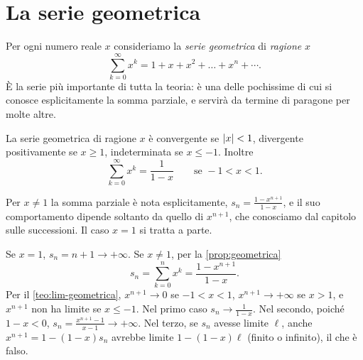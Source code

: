 \section{La serie geometrica}
\label{sec:serie-geometrica}

Per ogni numero reale $x$ consideriamo la \emph{serie geometrica} di \emph{ragione} $x$
\begin{equation}\label{eq:serie-geometrica-def}
  \sum_{k=0}^{\infty}x^{k}=1+x+x^{2}+\dots+x^{n}+\cdots .
\end{equation}
È la serie più importante di tutta la teoria: è una delle pochissime di cui si conosce
esplicitamente la somma parziale, e servirà da termine di paragone per molte altre.

\begin{teorema}\label{teo:serie-geometrica}
La serie geometrica di ragione $x$ è convergente se $\lvert x\rvert<1$, divergente
positivamente se $x\ge1$, indeterminata se $x\le-1$. Inoltre
\begin{equation}\label{eq:serie-geometrica}
  \sum_{k=0}^{\infty}x^{k}=\frac1{1-x} \qquad\text{se } -1<x<1 .
\end{equation}
\end{teorema}

\begin{schema}
\end{schema}

\begin{strategia}
Per $x\neq1$ la somma parziale è nota esplicitamente, $s_{n}=\frac{1-x^{n+1}}{1-x}$, e il suo
comportamento dipende soltanto da quello di $x^{n+1}$, che conosciamo dal capitolo sulle
successioni. Il caso $x=1$ si tratta a parte.
\end{strategia}

\begin{dimostrazione}
Se $x=1$, $s_{n}=n+1\to+\infty$. Se $x\neq1$, per la \cref{prop:geometrica}
\begin{equation}\label{eq:somma-parziale-geometrica}
  s_{n}=\sum_{k=0}^{n}x^{k}=\frac{1-x^{n+1}}{1-x} .
\end{equation}
Per il \cref{teo:lim-geometrica}, $x^{n+1}\to0$ se $-1<x<1$, $x^{n+1}\to+\infty$ se $x>1$, e
$x^{n+1}$ non ha limite se $x\le-1$. Nel primo caso $s_{n}\to\frac1{1-x}$. Nel secondo, poiché
$1-x<0$, $s_{n}=\frac{x^{n+1}-1}{x-1}\to+\infty$. Nel terzo, se $s_{n}$ avesse limite $\ell$, anche
$x^{n+1}=1-(1-x)s_{n}$ avrebbe limite $1-(1-x)\ell$ (finito o infinito), il che è falso.
\end{dimostrazione}

